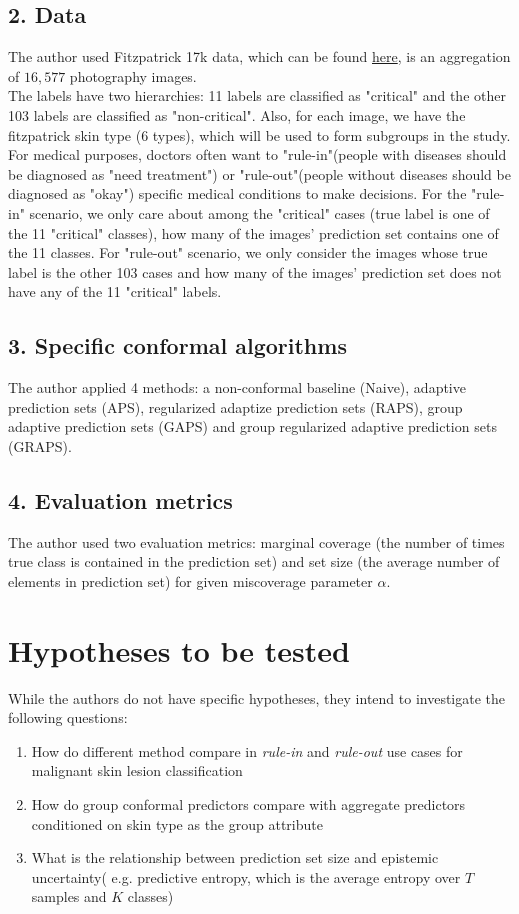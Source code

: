\documentclass{article}
\begin{document}
\subsection*{2. Data}
The author used Fitzpatrick 17k data, which can be found \href{https://github.com/mattgroh/fitzpatrick17k}{here}, is an aggregation of $16,577$ photography images.\\

The labels have two hierarchies: 11 labels are classified as "critical" and the other 103 labels are classified as "non-critical". Also, for each image, we have the fitzpatrick skin type (6 types), which will be used to form subgroups in the study.\\

For medical purposes, doctors often want to "rule-in"(people with diseases should be diagnosed as "need treatment") or "rule-out"(people without diseases should be diagnosed as "okay") specific medical conditions to make decisions.
For the "rule-in" scenario, we only care about among the "critical" cases (true label is one of the 11 "critical" classes), how many of the images' prediction set contains one of the 11 classes. For "rule-out" scenario, we only consider the images whose true label is the other 103 cases and how many of the images' prediction set does not have any of the 11 "critical" labels. 
\subsection*{3. Specific conformal algorithms}
The author applied 4 methods: a non-conformal baseline (Naive), adaptive prediction sets (APS), regularized adaptize prediction sets (RAPS), group adaptive prediction sets (GAPS) and group regularized adaptive prediction sets (GRAPS).\\
\subsection*{4. Evaluation metrics}
The author used two evaluation metrics: marginal coverage (the number of times true class is contained in the prediction set) and set size (the average number of elements in prediction set) for given miscoverage parameter $\alpha$.



\section*{Hypotheses to be tested}
While the authors do not have specific hypotheses, they intend to investigate the following questions:
\begin{enumerate}
    \item How do different method compare in \textit{rule-in} and \textit{rule-out} use cases for malignant skin lesion classification
    \item How do group conformal predictors compare with aggregate predictors conditioned on skin type as the group attribute
    \item  What is the relationship between prediction set size and epistemic uncertainty( e.g. predictive entropy, which is the average entropy over $T$ samples and $K$
classes)
\end{enumerate}
\end{document}

